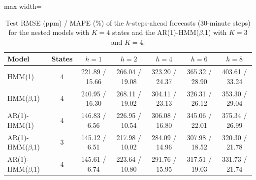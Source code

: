 \begin{table}[ht]
\centering
\begin{adjustbox}{max width=\textwidth}
\begin{tabular}{lcccccc}
\hline
Model & States & $h=1$ & $h=2$ & $h=4$ & $h=6$ & $h=8$ \\
\hline
HMM(1) & 4 & 221.89 / 15.66 & 266.04 / 19.08 & 323.20 / 24.37 & 365.32 / 28.90 & 403.61 / 33.24 \\
HMM($\beta$,1) & 4 & 240.95 / 16.30 & 268.11 / 19.02 & 304.11 / 23.13 & 326.31 / 26.12 & 353.30 / 29.04 \\
AR(1)-HMM(1) & 4 & 146.83 / 6.56 & 226.95 / 10.54 & 306.08 / 16.80 & 345.06 / 22.01 & 375.34 / 26.99 \\
AR(1)-HMM($\beta$,1) & 3 & 145.12 / 6.51 & 217.98 / 10.02 & 284.09 / 14.96 & 307.98 / 18.52 & 320.30 / 21.78 \\
AR(1)-HMM($\beta$,1) & 4 & 145.61 / 6.74 & 223.64 / 10.80 & 291.76 / 15.95 & 317.51 / 19.03 & 331.73 / 21.74 \\
\hline
\end{tabular}
\end{adjustbox}
\caption{Test RMSE (ppm) / MAPE (\%) of the $h$-steps-ahead forecasts (30-minute steps) for the nested models with $K=4$ states and the AR(1)-HMM($\beta$,1) with $K=3$ and $K=4$.}
\label{tab:test_metrics_room_015_calibrated_anchor_random_search}
\end{table}
